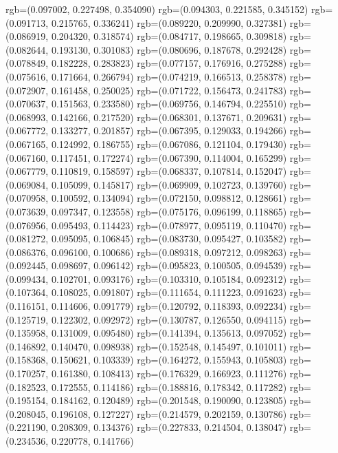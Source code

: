 {{{					rgb=(0.097002, 0.227498, 0.354090)
					rgb=(0.094303, 0.221585, 0.345152)
					rgb=(0.091713, 0.215765, 0.336241)
					rgb=(0.089220, 0.209990, 0.327381)
					rgb=(0.086919, 0.204320, 0.318574)
					rgb=(0.084717, 0.198665, 0.309818)
					rgb=(0.082644, 0.193130, 0.301083)
					rgb=(0.080696, 0.187678, 0.292428)
					rgb=(0.078849, 0.182228, 0.283823)
					rgb=(0.077157, 0.176916, 0.275288)
					rgb=(0.075616, 0.171664, 0.266794)
					rgb=(0.074219, 0.166513, 0.258378)
					rgb=(0.072907, 0.161458, 0.250025)
					rgb=(0.071722, 0.156473, 0.241783)
					rgb=(0.070637, 0.151563, 0.233580)
					rgb=(0.069756, 0.146794, 0.225510)
					rgb=(0.068993, 0.142166, 0.217520)
					rgb=(0.068301, 0.137671, 0.209631)
					rgb=(0.067772, 0.133277, 0.201857)
					rgb=(0.067395, 0.129033, 0.194266)
					rgb=(0.067165, 0.124992, 0.186755)
					rgb=(0.067086, 0.121104, 0.179430)
					rgb=(0.067160, 0.117451, 0.172274)
					rgb=(0.067390, 0.114004, 0.165299)
					rgb=(0.067779, 0.110819, 0.158597)
					rgb=(0.068337, 0.107814, 0.152047)
					rgb=(0.069084, 0.105099, 0.145817)
					rgb=(0.069909, 0.102723, 0.139760)
					rgb=(0.070958, 0.100592, 0.134094)
					rgb=(0.072150, 0.098812, 0.128661)
					rgb=(0.073639, 0.097347, 0.123558)
					rgb=(0.075176, 0.096199, 0.118865)
					rgb=(0.076956, 0.095493, 0.114423)
					rgb=(0.078977, 0.095119, 0.110470)
					rgb=(0.081272, 0.095095, 0.106845)
					rgb=(0.083730, 0.095427, 0.103582)
					rgb=(0.086376, 0.096100, 0.100686)
					rgb=(0.089318, 0.097212, 0.098263)
					rgb=(0.092445, 0.098697, 0.096142)
					rgb=(0.095823, 0.100505, 0.094539)
					rgb=(0.099434, 0.102701, 0.093176)
					rgb=(0.103310, 0.105184, 0.092312)
					rgb=(0.107364, 0.108025, 0.091807)
					rgb=(0.111654, 0.111223, 0.091623)
					rgb=(0.116151, 0.114606, 0.091779)
					rgb=(0.120792, 0.118393, 0.092234)
					rgb=(0.125719, 0.122302, 0.092972)
					rgb=(0.130787, 0.126550, 0.094115)
					rgb=(0.135958, 0.131009, 0.095480)
					rgb=(0.141394, 0.135613, 0.097052)
					rgb=(0.146892, 0.140470, 0.098938)
					rgb=(0.152548, 0.145497, 0.101011)
					rgb=(0.158368, 0.150621, 0.103339)
					rgb=(0.164272, 0.155943, 0.105803)
					rgb=(0.170257, 0.161380, 0.108413)
					rgb=(0.176329, 0.166923, 0.111276)
					rgb=(0.182523, 0.172555, 0.114186)
					rgb=(0.188816, 0.178342, 0.117282)
					rgb=(0.195154, 0.184162, 0.120489)
					rgb=(0.201548, 0.190090, 0.123805)
					rgb=(0.208045, 0.196108, 0.127227)
					rgb=(0.214579, 0.202159, 0.130786)
					rgb=(0.221190, 0.208309, 0.134376)
					rgb=(0.227833, 0.214504, 0.138047)
					rgb=(0.234536, 0.220778, 0.141766)
}}}
